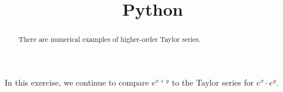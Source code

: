 \documentclass{ximera}
\title{Python}
\begin{document}
\begin{abstract}
	There are numerical examples of higher-order Taylor series.
\end{abstract}

In this exercise, we continue to compare $e^{x+y}$ to the Taylor series for $e^x \cdot e^y$.
	
\end{document}
